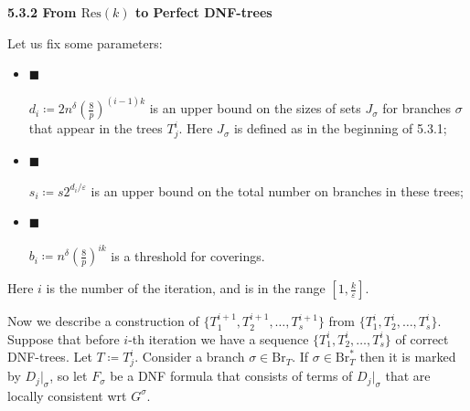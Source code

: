 \documentclass[10pt,a4paper]{article}
\begin{document}
\par\medskip\noindent\textbf{
5.3.2 From $\mathrm{Res}(k)$ to Perfect DNF-trees}\par




Let us fix some parameters:\par


\begin{itemize}


\item[] 
$\blacksquare$ 


$d_{i}\coloneqq 2n^{\delta}\left(\frac{8}{p}\right)^{(i-1)k}$ is an upper bound on the sizes
of sets $J_{\sigma}$ for branches $\sigma$ that appear in the trees $T^{i}_{j}$. Here $J_{\sigma}$ is
defined as in the beginning of 5.3.1;\par





\item[] 
$\blacksquare$ 


$s_{i}\coloneqq s2^{d_{i}/\varepsilon}$ is an upper bound on the total number on branches in these
trees;\par





\item[] 
$\blacksquare$ 


$b_{i}\coloneqq n^{\delta}\left(\frac{8}{p}\right)^{ik}$ is a threshold for coverings.\par





\end{itemize}




Here $i$ is the number of the iteration, and is in the range $[1,\frac{k}{\varepsilon}]$.\par




Now we describe a construction of $\{T^{i+1}_{1},T^{i+1}_{2},\dots,T^{i+1}_{s}\}$ from $\{T^{i}_{1},T^{i}_{2},\dots,T^{i}_{s}\}$. Suppose that before $i$-th iteration we have a sequence $\{T^{i}_{1},T^{i}_{2},\dots,T^{i}_{s}\}$ of correct DNF-trees. Let $T\coloneqq T^{i}_{j}$. Consider a branch $\sigma\in\mathrm{Br}_{T}$. If
$\sigma\in\mathrm{Br}^{*}_{T}$ then it is marked by $D_{j}|_{\sigma}$, so let $F_{\sigma}$ be a DNF formula that
consists of terms of $D_{j}|_{\sigma}$ that are locally consistent wrt $G^{\sigma}$.\par
\end{document}
